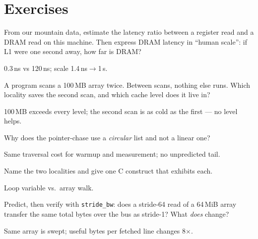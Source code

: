 \section*{Exercises}

\begin{exercise}[easy]

From our mountain data, estimate the latency ratio between a
register read and a DRAM read on this machine. Then express DRAM
latency in ``human scale'': if L1 were one second away, how far is
DRAM?
\end{exercise}
\begin{solution}[hint]
0.3\,ns vs 120\,ns; scale 1.4\,ns$\to$1\,s.
\end{solution}

\begin{exercise}[easy]

A program scans a 100\,MB array twice. Between scans, nothing else
runs. Which locality saves the second scan, and which cache level
does it live in?
\end{exercise}
\begin{solution}[hint]
100\,MB exceeds every level; the second scan is as cold as the
first --- no level helps.
\end{solution}

\begin{exercise}[easy]

Why does the pointer-chase use a \emph{circular} list and not a
linear one?
\end{exercise}
\begin{solution}[hint]
Same traversal cost for warmup and measurement; no
unpredicted tail.
\end{solution}

\begin{exercise}[easy]

Name the two localities and give one C construct that exhibits each.
\end{exercise}
\begin{solution}[hint]
Loop variable vs.\ array walk.
\end{solution}

\begin{exercise}[medium]

Predict, then verify with \texttt{stride\_bw}: does a stride-64 read
of a 64\,MiB array transfer the same total bytes over the bus as
stride-1? What \emph{does} change?
\end{exercise}
\begin{solution}[hint]
Same array is swept; useful bytes per fetched line changes
8$\times$.
\end{solution}

